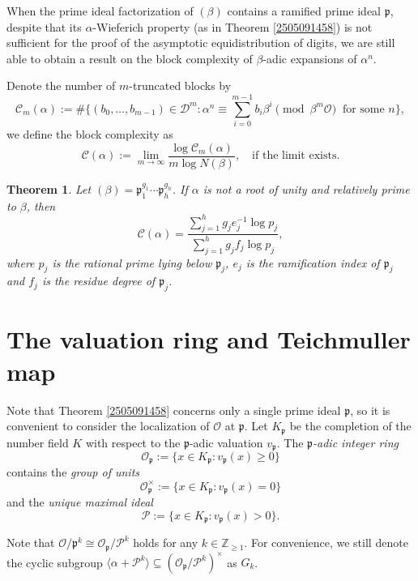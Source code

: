 \documentclass[12pt]{amsart}
\theoremstyle{plain}
\newtheorem{thm}{Theorem}[section]
\theoremstyle{definition}
\theoremstyle{remark}
\numberwithin{equation}{section}
\begin{document}
	When the prime ideal factorization of $(\beta)$ contains a ramified prime ideal $\mathfrak{p}$, despite that its $\alpha$-Wieferich property (as in Theorem \ref{2505091458}) is not sufficient for the proof of the asymptotic equidistribution of digits, we are still able to obtain a result on the block complexity of $\beta$-adic expansions of $\alpha^n$. 
	
	Denote the number of $m$-truncated blocks by
	\[\mathcal{C}_m(\alpha):=\#\Big\{(b_0,\dots,b_{m-1})\in\mathcal{D}^m\colon\alpha^n\equiv\sum_{i=0}^{m-1}b_i\beta^i \!\!\pmod{\beta^m\mathcal{O}}\;\;\text{for some $n$}\Big\},\]
	we define the block complexity as 
	\[\mathcal{C}(\alpha):=\lim_{m\to\infty}\frac{\log\mathcal{C}_m(\alpha)}{m\log N(\beta)},\quad\text{if the limit exists}.\]
	\begin{thm}\label{2512261042}
		Let $(\beta)=\mathfrak{p}_1^{g_1}\cdots\mathfrak{p}_h^{g_h}$.  If $\alpha$ is not a root of unity and relatively prime to $\beta$, then
		\begin{equation}\label{2512261352}
			\mathcal{C}(\alpha)=\frac{\sum_{j=1}^{h}g_je_j^{-1}\log p_j}{\sum_{j=1}^{h}g_jf_j\log p_j},
		\end{equation}
		where $p_j$ is the rational prime lying below $\mathfrak{p}_j$, $e_j$ is the ramification index of $\mathfrak{ p}_j$ and $f_j$ is the residue degree of $\mathfrak{ p}_j$.
	\end{thm}
	
	
	
	
	
	\section{The valuation ring and Teichmuller map}
	
	Note that Theorem \ref{2505091458} concerns only a single prime ideal $\mathfrak{p}$, so it is convenient to consider the localization of \( \mathcal{O} \) at \( \mathfrak{p}\). Let \( K_{\mathfrak{p}} \) be the completion of the number field \( K \) with respect to the \( \mathfrak{p} \)-adic valuation \( v_\mathfrak{p} \). The \emph{\(\mathfrak{p} \)-adic integer ring}
	\[\mathcal{O}_\mathfrak{p} := \{ x \in K_\mathfrak{p} : v_\mathfrak{p}(x) \geq 0 \}\]
	contains the \emph{group of units}
	\[\mathcal{O}_\mathfrak{p}^\times := \{ x \in K_\mathfrak{p} : v_\mathfrak{p}(x) = 0 \}\]
	and the \emph{unique maximal ideal}
	\[\mathcal{P} := \{ x \in K_\mathfrak{p} : v_\mathfrak{p}(x) > 0 \}.\]
	
	Note that 
	$\mathcal{O}/\mathfrak{p}^k \cong \mathcal{O}_\mathfrak{p}/\mathcal{P}^k$ 
	holds for any \( k \in \mathbb{Z}_{\geq 1} \). 
	For convenience, we still denote the cyclic subgroup 
	$\langle \alpha + \mathcal{P}^k \rangle \subseteq (\mathcal{O}_\mathfrak{p}/\mathcal P^k)^\times$
	as \( G_k \).
	
\end{document}

